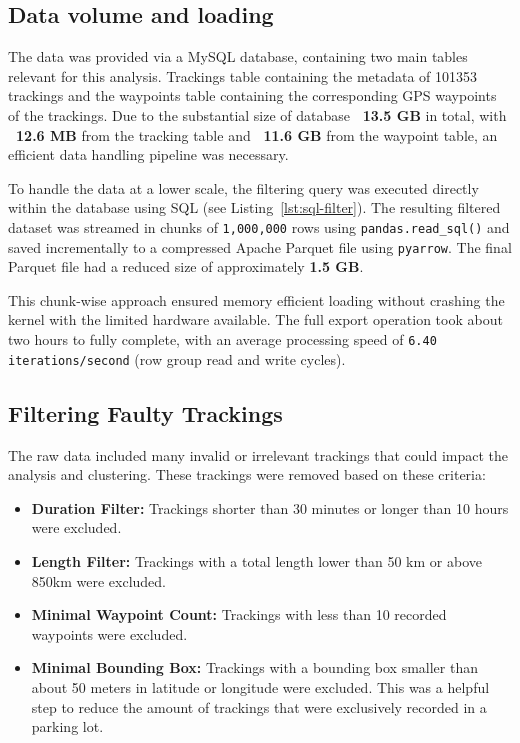 \documentclass[a4paper,12pt,twoside]{scrreprt}
\begin{document}
\subsection{Data volume and loading}

The data was provided via a MySQL database, containing two main tables relevant
for this analysis.
Trackings table containing the metadata of 101353 trackings and the waypoints
table containing the corresponding GPS waypoints of the trackings.
Due to the substantial size of database \textbf{~13.5 GB} in total, with
\textbf{~12.6 MB} from the tracking table and \textbf{~11.6 GB} from the
waypoint table,
an efficient data handling pipeline was necessary.

To handle the data at a lower scale, the filtering query was executed directly
within the database using SQL (see Listing~\ref{lst:sql-filter}). The resulting
filtered dataset was streamed in chunks of \texttt{1,000,000} rows using
\texttt{pandas.read\_sql()} and saved incrementally to a compressed Apache
Parquet file using \texttt{pyarrow}. The final Parquet file had a reduced size
of approximately \textbf{1.5 GB}.

This chunk-wise approach ensured memory efficient loading without crashing the
kernel with the limited hardware available.
The full export operation took about two hours to fully complete, with an
average processing speed of \texttt{6.40 iterations/second} (row group read and
write cycles).

\subsection{Filtering Faulty Trackings}
The raw data included many invalid or irrelevant trackings that could impact
the analysis and clustering. These trackings were removed based on these
criteria:

\begin{itemize}
  \item \textbf{Duration Filter:} Trackings shorter than 30 minutes or longer
        than 10 hours were excluded.
  \item \textbf{Length Filter:} Trackings with a total length lower than 50 km
        or above 850km were excluded.
  \item \textbf{Minimal Waypoint Count:} Trackings with less than 10 recorded
        waypoints were excluded.
  \item \textbf{Minimal Bounding Box:} Trackings with a bounding box smaller
        than about 50 meters in latitude or longitude were excluded. This was a
        helpful
        step to reduce the amount of trackings that were exclusively recorded
        in a
        parking lot.
\end{itemize}
\end{document}
